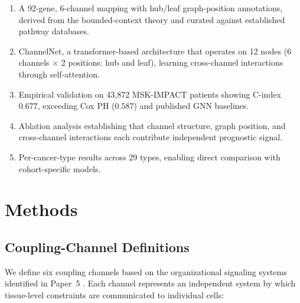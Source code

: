 \documentclass[11pt]{article}
\begin{document}
\begin{enumerate}
\item A 92-gene, 6-channel mapping with hub/leaf graph-position
   annotations, derived from the bounded-context theory and curated
   against established pathway databases.
\item ChannelNet, a transformer-based architecture that operates on
   12 nodes (6 channels $\times$ 2 positions: hub and leaf),
   learning cross-channel interactions through self-attention.
\item Empirical validation on 43{,}872 MSK-IMPACT patients showing
   C-index $0.677$, exceeding Cox PH ($0.587$) and published
   GNN baselines.
\item Ablation analysis establishing that channel structure,
   graph position, and cross-channel interactions each contribute
   independent prognostic signal.
\item Per-cancer-type results across 29 types, enabling direct
   comparison with cohort-specific models.
\end{enumerate}

\section{Methods}
\label{sec:methods}

\subsection{Coupling-Channel Definitions}

We define six coupling channels based on the organizational
signaling systems identified in Paper~5 \cite{McCarthy2026e}.
Each channel represents an independent system by which
tissue-level constraints are communicated to individual cells:
\end{document}
